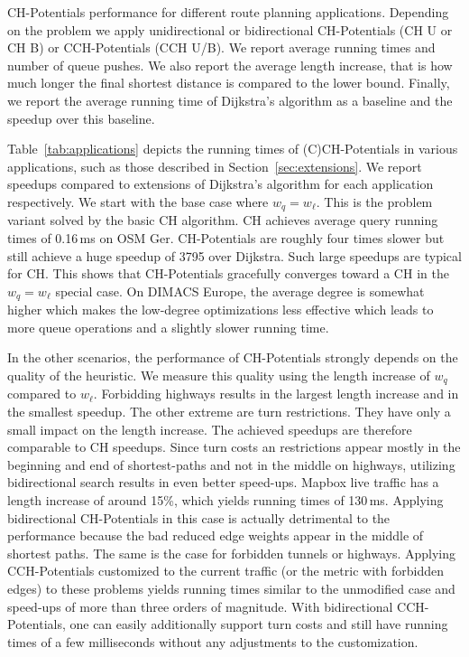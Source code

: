 \documentclass[manuscript,review]{acmart}
\begin{document}
\begin{table}
\centering
\caption{
CH-Potentials performance for different route planning applications.
Depending on the problem we apply unidirectional or bidirectional CH-Potentials (CH U or CH B) or CCH-Potentials (CCH U/B).
We report average running times and number of queue pushes.
We also report the average length increase, that is how much longer the final shortest distance is compared to the lower bound.
Finally, we report the average running time of Dijkstra's algorithm as a baseline and the speedup over this baseline.
}\label{tab:applications}

\end{table}

Table~\ref{tab:applications} depicts the running times of (C)CH-Potentials in various applications, such as those described in Section~\ref{sec:extensions}.
We report speedups compared to extensions of Dijkstra's algorithm for each application respectively.
We start with the base case where $w_q = w_\ell$.
This is the problem variant solved by the basic CH algorithm.
CH achieves average query running times of 0.16\,ms on OSM Ger.
CH-Potentials are roughly four times slower but still achieve a huge speedup of 3795 over Dijkstra.
Such large speedups are typical for CH.
This shows that CH-Potentials gracefully converges toward a CH in the $w_q = w_\ell$ special case.
On DIMACS Europe, the average degree is somewhat higher which makes the low-degree optimizations less effective which leads to more queue operations and a slightly slower running time.

In the other scenarios, the performance of CH-Potentials strongly depends on the quality of the heuristic.
We measure this quality using the length increase of $w_q$ compared to $w_\ell$.
Forbidding highways results in the largest length increase and in the smallest speedup.
The other extreme are turn restrictions.
They have only a small impact on the length increase.
The achieved speedups are therefore comparable to CH speedups.
Since turn costs an restrictions appear mostly in the beginning and end of shortest-paths and not in the middle on highways, utilizing bidirectional search results in even better speed-ups.
Mapbox live traffic has a length increase of around 15\%, which yields running times of 130\,ms.
Applying bidirectional CH-Potentials in this case is actually detrimental to the performance because the bad reduced edge weights appear in the middle of shortest paths.
The same is the case for forbidden tunnels or highways.
Applying CCH-Potentials customized to the current traffic (or the metric with forbidden edges) to these problems yields running times similar to the unmodified case and speed-ups of more than three orders of magnitude.
With bidirectional CCH-Potentials, one can easily additionally support turn costs and still have running times of a few milliseconds without any adjustments to the customization.
\end{document}
